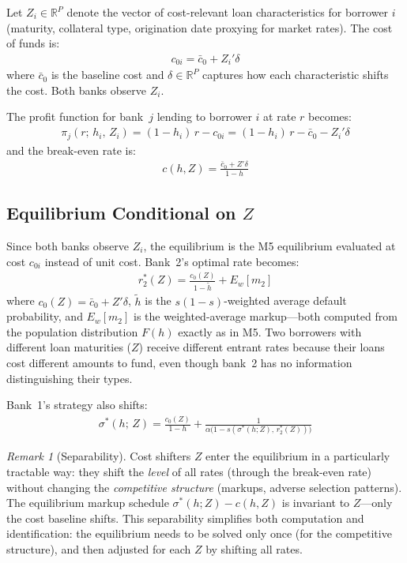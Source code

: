 \documentclass[12pt]{article}
\theoremstyle{plain}
\theoremstyle{plain}
\theoremstyle{definition}  %
\theoremstyle{remark}  %
\newtheorem{remark}[thm]{Remark}  %
\begin{document}
Let $Z_i \in \mathbb{R}^P$ denote the vector of cost-relevant loan characteristics for borrower $i$ (maturity, collateral type, origination date proxying for market rates). The cost of funds is:
\begin{align}\label{eq:cof}
    c_{0i} = \bar{c}_0 + Z_i'\delta
\end{align}
where $\bar{c}_0$ is the baseline cost and $\delta \in \mathbb{R}^P$ captures how each characteristic shifts the cost. Both banks observe $Z_i$.

\medskip\noindent
The profit function for bank~$j$ lending to borrower $i$ at rate $r$ becomes:
\begin{align}\label{eq:profit_cost}
    \pi_j(r;\, h_i,\, Z_i) = (1-h_i)\,r - c_{0i} = (1-h_i)\,r - \bar{c}_0 - Z_i'\delta
\end{align}
and the break-even rate is:
\begin{align}\label{eq:breakeven_cost}
    c(h, Z) = \frac{\bar{c}_0 + Z'\delta}{1-h}
\end{align}

\subsection{Equilibrium Conditional on $Z$}

Since both banks observe $Z_i$, the equilibrium is the M5 equilibrium evaluated at cost $c_{0i}$ instead of unit cost. Bank~2's optimal rate becomes:
\begin{align}\label{eq:r2_cost}
    r_2^*(Z) = \frac{c_{0}(Z)}{1 - \tilde{h}} + E_{w}[m_2]
\end{align}
where $c_0(Z) = \bar{c}_0 + Z'\delta$, $\tilde{h}$ is the $s(1-s)$-weighted average default probability, and $E_w[m_2]$ is the weighted-average markup---both computed from the population distribution $F(h)$ exactly as in M5. Two borrowers with different loan maturities ($Z$) receive different entrant rates because their loans cost different amounts to fund, even though bank~2 has no information distinguishing their types.

\medskip\noindent
Bank~1's strategy also shifts:
\begin{align}\label{eq:sigma_cost}
    \sigma^*(h;\, Z) = \frac{c_0(Z)}{1-h} + \frac{1}{\alpha\big(1 - s(\sigma^*(h; Z),\, r_2^*(Z))\big)}
\end{align}

\begin{remark}[Separability]
Cost shifters $Z$ enter the equilibrium in a particularly tractable way: they shift the \emph{level} of all rates (through the break-even rate) without changing the \emph{competitive structure} (markups, adverse selection patterns). The equilibrium markup schedule $\sigma^*(h; Z) - c(h, Z)$ is invariant to $Z$---only the cost baseline shifts. This separability simplifies both computation and identification: the equilibrium needs to be solved only once (for the competitive structure), and then adjusted for each $Z$ by shifting all rates.
\end{remark}
\end{document}
